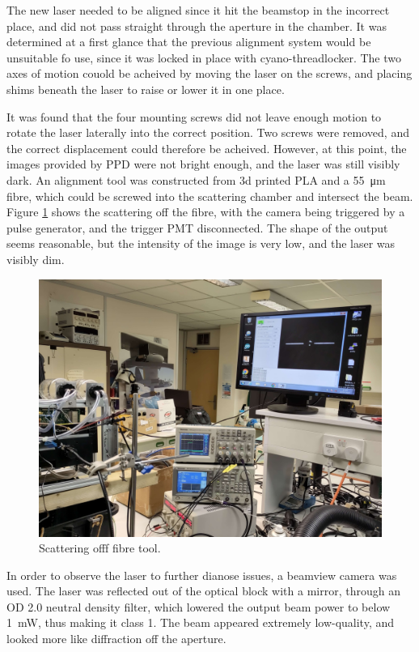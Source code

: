 

The new laser needed to be aligned since it hit the beamstop in the incorrect place, and did not pass straight through the aperture in the chamber. It was determined at a first glance that the previous alignment system would be unsuitable fo use, since it was locked in place with cyano-threadlocker. The two axes of motion couold be acheived by moving the laser on the screws, and placing shims beneath the laser to raise or lower it in one place.

It was found that the four mounting screws did not leave enough motion to rotate the laser laterally into the correct position. Two screws were removed, and the correct displacement could therefore be acheived. However, at this point, the images provided by PPD were not bright enough, and the laser was still visibly dark. An alignment tool was constructed from 3d printed PLA and a \SI{55}{\micro\metre} fibre, which could be screwed into the scattering chamber and intersect the beam. Figure \ref{fig:PPDFibreScatter} shows the scattering off the fibre, with the camera being triggered by a pulse generator, and the trigger PMT disconnected. The shape of the output seems reasonable, but the intensity of the image is very low, and the laser was visibly dim.

\begin{figure}[H]
\begin{center}
\includegraphics[width=0.5\linewidth]{Figures/PPDFibreScatter}
\end{center}
\caption{Scattering offf fibre tool.}
\label{fig:PPDFibreScatter}
\end{figure}

In order to observe the laser to further dianose issues, a beamview camera was used. The laser was reflected out of the optical block with a mirror, through an OD 2.0 neutral density filter, which lowered the output beam power to below \SI{1}{\milli\watt}, thus making it class 1. The beam appeared extremely low-quality, and looked more like diffraction off the aperture.

